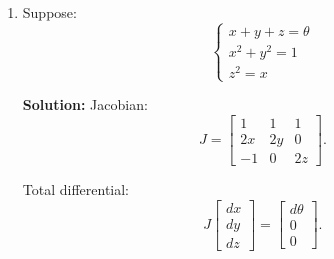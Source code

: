\documentclass[12pt]{article}
\begin{document}
\begin{enumerate}
\textbf{Solution:}  
Jacobian wrt $(x,y)$:
\[
J =
\begin{bmatrix}
2x & 1 \\
y & x
\end{bmatrix}.
\]
At $(1,1)$:
\[
\det(J) = 2(1) - 1 = 1 \neq 0.
\]
So IFT applies: $(x(\theta),y(\theta))$ exist and are differentiable near $\theta=2$.  

Differentiating:
\[
\begin{bmatrix}
2x & 1 \\
y & x
\end{bmatrix}
\begin{bmatrix}
dx/d\theta \\
dy/d\theta
\end{bmatrix}
=
\begin{bmatrix}
1 \\
0
\end{bmatrix}.
\]
At $(1,1)$:
\[
\begin{bmatrix}
2 & 1 \\
1 & 1
\end{bmatrix}
\begin{bmatrix}
dx/d\theta \\
dy/d\theta
\end{bmatrix}
=
\begin{bmatrix}
1 \\
0
\end{bmatrix}.
\]
Solving:
\[
dx/d\theta = 1, \quad dy/d\theta = -1.
\]



\item
Suppose:
\[
\begin{cases}
x + y + z = \theta \\
x^2 + y^2 = 1 \\
z^2 = x
\end{cases}
\]

\textbf{Solution:}  
Jacobian:
\[
J =
\begin{bmatrix}
1 & 1 & 1 \\
2x & 2y & 0 \\
-1 & 0 & 2z
\end{bmatrix}.
\]

Total differential:
\[
J
\begin{bmatrix}
dx \\ dy \\ dz
\end{bmatrix}
=
\begin{bmatrix}
d\theta \\ 0 \\ 0
\end{bmatrix}.
\]


\end{enumerate}
\end{document}
